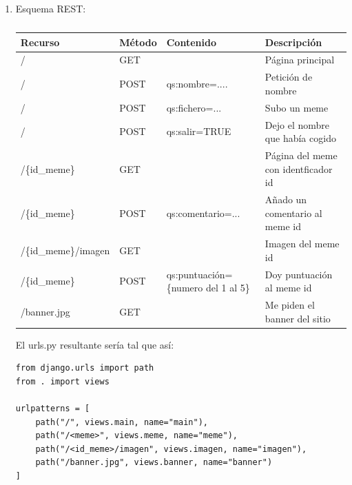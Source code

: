 \begin{enumerate}
  \item Esquema REST:

\begin{table}[]
\begin{tabular}{|l|l|l|l|}
 \hline
Recurso                & Método & Contenido                                            & Descripción                           \\ \hline \hline
/                      & GET    &                                                      & Página principal                      \\ \hline 
/                      & POST   & qs:nombre=....                                       & Petición de nombre                    \\ \hline
/                      & POST   & qs:fichero=...                                       & Subo un meme                \\ \hline
/                      & POST   & qs:salir=TRUE                                        & Dejo el nombre que había cogido \\ \hline
/\{id\_meme\}          & GET    &                                                      & Página del meme con identficador id \\ \hline
/\{id\_meme\}          & POST   & qs:comentario=...                                    & Añado un comentario al meme id   \\ \hline
/\{id\_meme\}/imagen   & GET    &                                                      & Imagen del meme id                \\ \hline
/\{id\_meme\}          & POST   & qs:puntuación=\{numero del 1 al 5\}                  & Doy puntuación al meme id              \\ \hline
/banner.jpg            & GET    &                                                      & Me piden el banner del sitio \\ \hline
\end{tabular}
\caption{}
\label{tab:my-table}
\end{table}

El urls.py resultante sería tal que así:

\begin{verbatim}
from django.urls import path
from . import views

urlpatterns = [
    path("/", views.main, name="main"),
    path("/<meme>", views.meme, name="meme"),
    path("/<id_meme>/imagen", views.imagen, name="imagen"),
    path("/banner.jpg", views.banner, name="banner")
]
\end{verbatim}


\end{enumerate}
